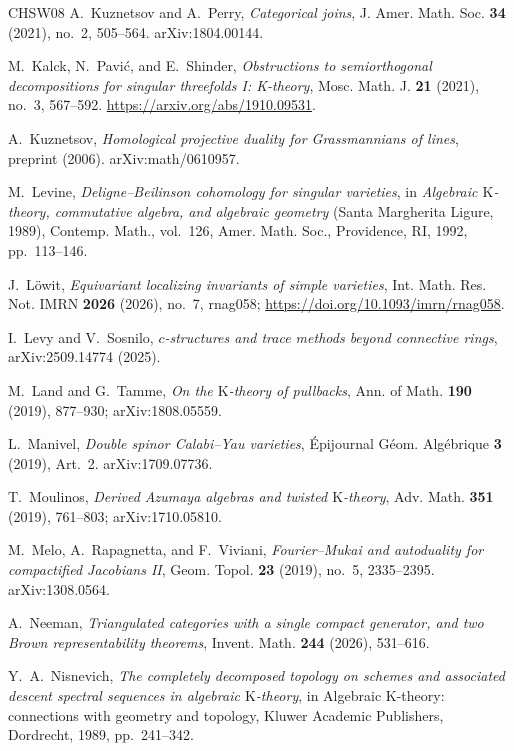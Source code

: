 \documentclass{amsart}
\theoremstyle{plain}
\theoremstyle{definition}
\newcommand{\K}{\mathrm{K}}
\begin{document}
\begin{thebibliography}{CHSW08}
A.~Kuznetsov and A.~Perry,
\emph{Categorical joins}, J. Amer. Math. Soc. \textbf{34} (2021), no.~2, 505--564.
arXiv:1804.00144.



M.~Kalck, N.~Pavi\'c, and E.~Shinder,
\emph{Obstructions to semiorthogonal decompositions for singular threefolds I: K-theory}, Mosc. Math. J. \textbf{21} (2021), no.~3, 567--592.
\url{https://arxiv.org/abs/1910.09531}.


A.~Kuznetsov,
\emph{Homological projective duality for Grassmannians of lines}, preprint (2006).
arXiv:math/0610957.



M.~Levine,
\emph{Deligne--Beilinson cohomology for singular varieties}, in \emph{Algebraic $\K$-theory, commutative algebra, and algebraic geometry} (Santa Margherita Ligure, 1989), Contemp. Math., vol.~126, Amer. Math. Soc., Providence, RI, 1992, pp.~113--146.

J.~L\"owit,
\emph{Equivariant localizing invariants of simple varieties}, Int. Math. Res. Not. IMRN \textbf{2026} (2026), no.~7, rnag058;
\url{https://doi.org/10.1093/imrn/rnag058}.

I.~Levy and V.~Sosnilo,
\emph{$c$-structures and trace methods beyond connective rings}, arXiv:2509.14774 (2025).

M.~Land and G.~Tamme, \emph{On the $\K$-theory of pullbacks}, Ann. of Math. \textbf{190} (2019), 877--930; arXiv:1808.05559.

L.~Manivel,
\emph{Double spinor Calabi--Yau varieties},
\'Epijournal G\'eom. Alg\'ebrique \textbf{3} (2019), Art.~2.
arXiv:1709.07736.



T.~Moulinos,
\emph{Derived Azumaya algebras and twisted $\K$-theory}, Adv. Math. \textbf{351} (2019), 761--803;
arXiv:1710.05810.

M.~Melo, A.~Rapagnetta, and F.~Viviani,
\emph{Fourier--Mukai and autoduality for compactified Jacobians II}, Geom. Topol. \textbf{23} (2019), no.~5, 2335--2395.
arXiv:1308.0564.


A.~Neeman,
\emph{Triangulated categories with a single compact generator, and two Brown representability theorems}, Invent. Math. \textbf{244} (2026), 531--616.

Y.~A.~Nisnevich,
\emph{The completely decomposed topology on schemes and associated descent spectral sequences in algebraic $\K$-theory}, in Algebraic $\K$-theory: connections with geometry and topology, Kluwer Academic Publishers, Dordrecht, 1989, pp.~241--342.


\end{thebibliography}
\end{document}
